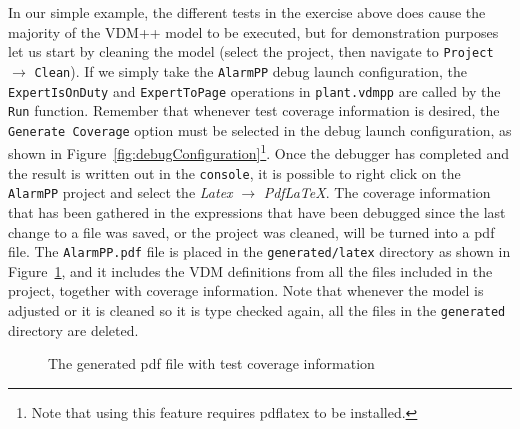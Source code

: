 In our simple example, the different tests in the exercise above does cause the majority of the VDM++ model to be executed, but for demonstration purposes let us start by cleaning the model (select the project, then navigate to \texttt{Project} $\rightarrow$ \texttt{Clean}). If we simply take the \texttt{AlarmPP} debug launch configuration, the \verb|ExpertIsOnDuty| and \verb|ExpertToPage| operations in \verb|plant.vdmpp| are called by the \texttt{Run} function. Remember that whenever test coverage information is desired, the \texttt{Generate Coverage} option must be selected in the debug launch configuration, as shown in Figure~\ref{fig:debugConfiguration}\footnote{Note that using this feature requires pdflatex to be installed.}. Once the debugger has completed and the result is written out in the \texttt{console}, it is possible to right click on the \texttt{AlarmPP} project and select the \emph{Latex} $ \rightarrow $ \emph{PdfLaTeX}. The coverage information that has been gathered in the expressions that have been debugged since the last change to a file was saved, or the project was cleaned, will be turned into a pdf file. The \texttt{AlarmPP.pdf} file is placed in the \texttt{generated/latex} directory as shown in Figure~\ref{fig:testcov}, and it includes the
VDM definitions from all the files included in the project, together with coverage information. Note that whenever the model is adjusted or it is cleaned so it is type checked again, all the files in the \texttt{generated} directory are deleted.
%
\begin{figure}[tb]
\begin{center}
\end{center}
\caption{The generated pdf file with test coverage information\label{fig:testcov}}
\end{figure}

